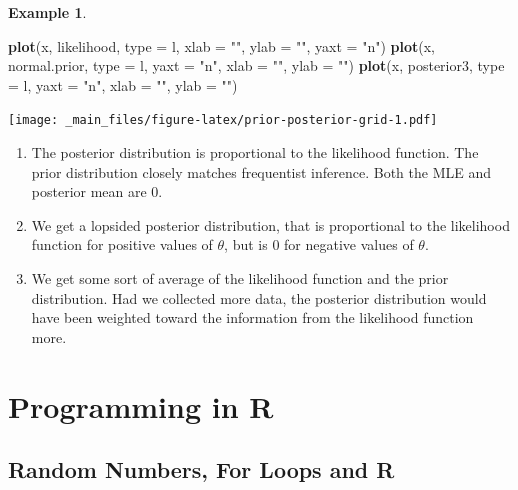 \documentclass[
]{book}
\newenvironment{Shaded}{\begin{snugshade}}{\end{snugshade}}
\newcommand{\AttributeTok}[1]{\textcolor[rgb]{0.13,0.29,0.53}{#1}}
\newcommand{\FunctionTok}[1]{\textcolor[rgb]{0.13,0.29,0.53}{\textbf{#1}}}
\newcommand{\NormalTok}[1]{#1}
\newcommand{\StringTok}[1]{\textcolor[rgb]{0.31,0.60,0.02}{#1}}
\theoremstyle{definition}
\theoremstyle{definition}
\newtheorem{example}{Example}[chapter]
\theoremstyle{definition}
\theoremstyle{definition}
\theoremstyle{remark}
\begin{document}
\begin{example}
\begin{Shaded}
\begin{Highlighting}[]
\FunctionTok{plot}\NormalTok{(x, likelihood, }\AttributeTok{type =} \StringTok{\textquotesingle{}l\textquotesingle{}}\NormalTok{, }\AttributeTok{xlab =} \StringTok{""}\NormalTok{, }\AttributeTok{ylab =} \StringTok{""}\NormalTok{, }\AttributeTok{yaxt =} \StringTok{"n"}\NormalTok{)}
\FunctionTok{plot}\NormalTok{(x, normal.prior, }\AttributeTok{type =} \StringTok{\textquotesingle{}l\textquotesingle{}}\NormalTok{, }\AttributeTok{yaxt =} \StringTok{"n"}\NormalTok{, }\AttributeTok{xlab =} \StringTok{""}\NormalTok{, }\AttributeTok{ylab =} \StringTok{""}\NormalTok{)}
\FunctionTok{plot}\NormalTok{(x, posterior3, }\AttributeTok{type =} \StringTok{\textquotesingle{}l\textquotesingle{}}\NormalTok{, }\AttributeTok{yaxt =} \StringTok{"n"}\NormalTok{, }\AttributeTok{xlab =} \StringTok{""}\NormalTok{, }\AttributeTok{ylab =} \StringTok{""}\NormalTok{)}
\end{Highlighting}
\end{Shaded}

\texttt{[image: \_main\_files/figure-latex/prior-posterior-grid-1.pdf]}

\begin{enumerate}
\def\labelenumi{\arabic{enumi}.}
\item
  The posterior distribution is proportional to the likelihood function. The prior distribution closely matches frequentist inference. Both the MLE and posterior mean are 0.
\item
  We get a lopsided posterior distribution, that is proportional to the likelihood function for positive values of \(\theta\), but is 0 for negative values of \(\theta\).
\item
  We get some sort of average of the likelihood function and the prior distribution. Had we collected more data, the posterior distribution would have been weighted toward the information from the likelihood function more.
\end{enumerate}

\end{example}

\hypertarget{programming-in-r}{%
\chapter{Programming in R}\label{programming-in-r}}

\hypertarget{random-numbers-for-loops-and-r}{%
\section{Random Numbers, For Loops and R}\label{random-numbers-for-loops-and-r}}
\end{document}
